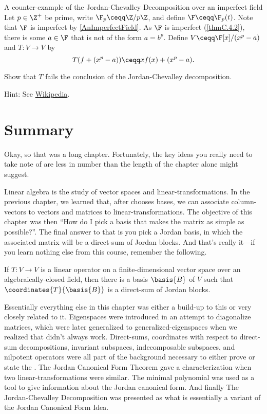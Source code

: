 \begin{exm}{A counter-example of the Jordan-Chevalley Decomposition over an imperfect field}{}
	Let $p\in \Z ^+$ be prime, write $\F _p\ceqq \Z /p\Z$, and define $\F \ceqq \F _p(t)$.  Note that $\F$ is imperfect by \cref{AnImperfectField}.  As $\F$ is imperfect (\cref{thmC.4.2}), there is some $a\in \F$ that is not of the form $a=b^p$.  Define $V\ceqq \F [x]/(x^p-a)$ and $T\colon V\rightarrow V$ by
	\begin{equation}
		T(f+(x^p-a))\ceqq xf(x)+(x^p-a).
	\end{equation}
	\begin{exr}[breakable=false]{}{}
		Show that $T$ fails the conclusion of the Jordan-Chevalley decomposition.
		\begin{rmk}
			Hint:  See \href{https://www.wikiwand.com/en/Jordan\%E2\%80\%93Chevalley_decomposition#/Counterexample}{Wikipedia}.
		\end{rmk}
	\end{exr}
\end{exm}

\section{Summary}

Okay, so that was a long chapter.  Fortunately, the key ideas you really need to take note of are less in number than the length of the chapter alone might suggest.

Linear algebra is the study of vector spaces and linear-transformations.  In the previous chapter, we learned that, after chooses bases, we can associate column-vectors to vectors and matrices to linear-transformations.  The objective of this chapter was then ``How do I pick a basis that makes the matrix as simple as possible?''.  The final answer to that is you pick a Jordan basis, in which the associated matrix will be a direct-sum of Jordan blocks.  And that's really it---if you learn nothing else from this course, remember the following.
\begin{important}
	If $T\colon V\rightarrow V$ is a linear operator on a finite-dimensional vector space over an algebraically-closed field, then there is a basis $\basis{B}$ of $V$ such that $\coordinates{T}{\basis{B}}$ is a direct-sum of Jordan blocks.
\end{important}

Essentially everything else in this chapter was either a build-up to this or very closely related to it.  Eigenspaces were introduced in an attempt to diagonalize matrices, which were later generalized to generalized-eigenspaces when we realized that didn't always work.  Direct-sums, coordinates with respect to direct-sum decompositions, invariant subspaces, indecomposable subspaces, and nilpotent operators were all part of the background necessary to either prove or state the .  The Jordan Canonical Form Theorem gave a characterization when two linear-transformations were similar.  The minimal polynomial was used as a tool to give information about the Jordan canonical form.  And finally The Jordan-Chevalley Decomposition was presented as what is essentially a variant of the Jordan Canonical Form Idea.

